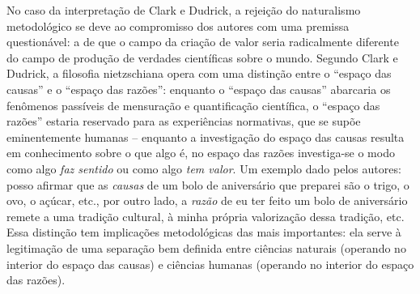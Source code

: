 \documentclass[
	12pt,				%
	openright,			%
	oneside,			%
	a4paper,			%
	english,			%
	french,				%
	spanish,			%
	brazil				%
	]{abntex2}
\begin{document}
No caso da interpretação de Clark e Dudrick, a rejeição do naturalismo metodológico se deve ao compromisso dos autores com uma premissa questionável: a de que o campo da criação de valor seria radicalmente diferente do campo de produção de verdades científicas sobre o mundo. Segundo Clark e Dudrick, a filosofia nietzschiana opera com uma distinção entre o “espaço das causas” e o “espaço das razões”: enquanto o “espaço das causas” abarcaria os fenômenos passíveis de mensuração e quantificação científica, o “espaço das razões” estaria reservado para as experiências normativas, que se supõe eminentemente humanas – enquanto a investigação do espaço das causas resulta em conhecimento sobre o que algo é, no espaço das razões investiga-se o modo como algo \textit{faz sentido} ou como algo \textit{tem valor}. Um exemplo dado pelos autores: posso afirmar que as \textit{causas} de um bolo de aniversário que preparei são o trigo, o ovo, o açúcar, etc., por outro lado, a \textit{razão} de eu ter feito um bolo de aniversário remete a uma tradição cultural, à minha própria valorização dessa tradição, etc. Essa distinção tem implicações metodológicas das mais importantes: ela serve à legitimação de uma separação bem definida entre ciências naturais (operando no interior do espaço das causas) e ciências humanas (operando no interior do espaço das razões).
\end{document}

